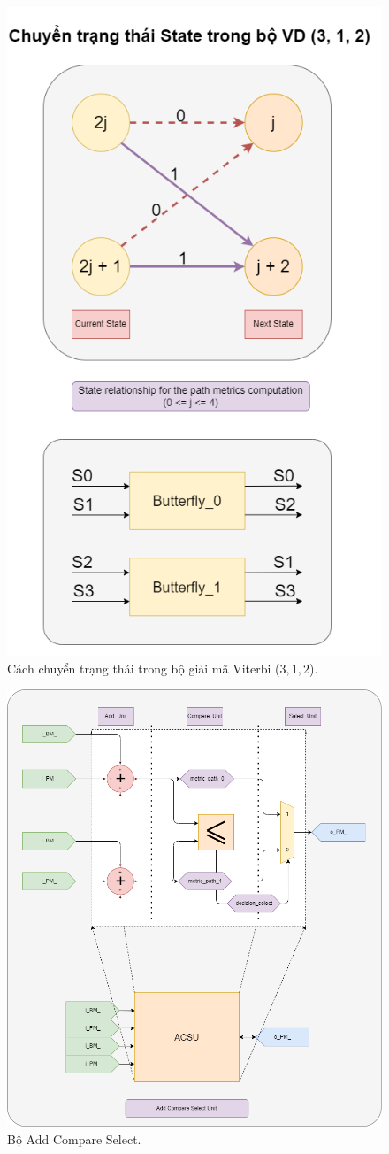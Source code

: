\begin{figure}[H]
	\centering
	\includegraphics[width=.6\linewidth]{sections/pic/mophongbangSystemVerilog/ACSU_proc_state.png}
	\caption{Cách chuyển trạng thái trong bộ giải mã Viterbi ($3, 1, 2$).}
\end{figure}

\begin{figure}[H]
	\centering
	\includegraphics[width=.8\linewidth]{sections/pic/mophongbangSystemVerilog/ACS.png}
	\caption{Bộ Add Compare Select.}
\end{figure}

